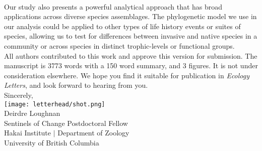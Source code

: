 \documentclass[11pt,a4paper]{article}
\begin{document}
\vspace{1.5ex}\\
Our study also presents a powerful analytical approach that has broad applications across diverse species assemblages. The phylogenetic model we use in our analysis could be applied to other types of life history events or suites of species, allowing us to test for differences between invasive and native species in a community or across species in distinct trophic-levels or functional groups.
\vspace{1.5ex}\\
\noindent All authors contributed to this work and approve this version for submission. The manuscript is 3773 words with a 150 word summary, and 3 figures. It is not under consideration elsewhere. We hope you find it suitable for publication in \emph{Ecology Letters}, and look forward to hearing from you. 
\vspace{1.5ex}\\
\noindent Sincerely, \\
\texttt{[image: letterhead/shot.png]} \\ 
\noindent Deirdre Loughnan\\
\noindent Sentinels of Change Postdoctoral Fellow\\ %
\noindent Hakai Institute $|$ Department of Zoology\\
\noindent University of British Columbia
\newpage
\vspace{-5ex}
% 


\newpage
\end{document}
